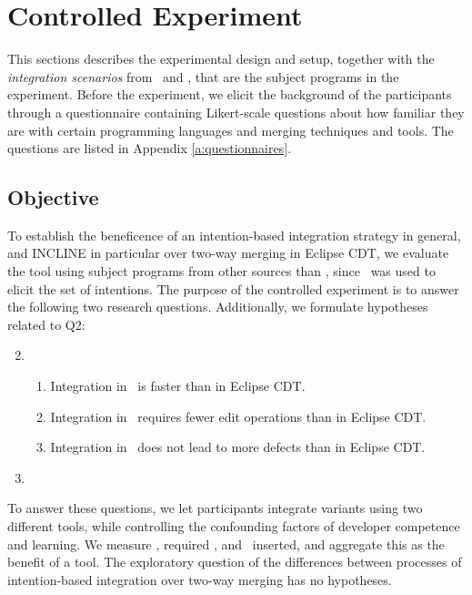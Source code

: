 \section{Controlled Experiment}
This sections describes the experimental design and setup, together with the \textit{integration scenarios} from \busybox~and \vim, that are the subject programs in the experiment. Before the experiment, we elicit the background of the participants through a questionnaire containing Likert-scale questions about how familiar they are with certain programming languages and merging techniques and tools. The questions are listed in Appendix \ref{a:questionnaires}.

\newcommand{\HA}{Integration in \tooln~is faster than in Eclipse CDT}
\newcommand{\HB}{Integration in \tooln~requires fewer edit operations than in Eclipse CDT}
\newcommand{\HC}{Integration in \tooln~does not lead to more defects than in Eclipse CDT}

\subsection{Objective}
To establish the beneficence of an intention-based integration strategy in general, and INCLINE in particular over two-way merging in Eclipse CDT, we evaluate the tool using subject programs from other sources than \marlin, since \marlin~was used to elicit the set of intentions. The purpose of the controlled experiment is to answer the following two research questions. Additionally, we formulate hypotheses related to Q2:

\begin{enumerate}[label={Q\arabic*}]
    \setcounter{enumi}{1}
    \item \RQB
    \begin{enumerate}[label={H\arabic*}]
        \item \HA.
        \item \HB.
        \item \HC.
    \end{enumerate}
    \item \RQC
\end{enumerate}

To answer these questions, we let participants integrate variants using two different tools, while controlling the confounding factors of developer competence and learning. We measure \ctime, required \eops, and ~inserted, and aggregate this as the benefit of a tool. The exploratory question of the differences between processes of intention-based integration over two-way merging has no hypotheses.

